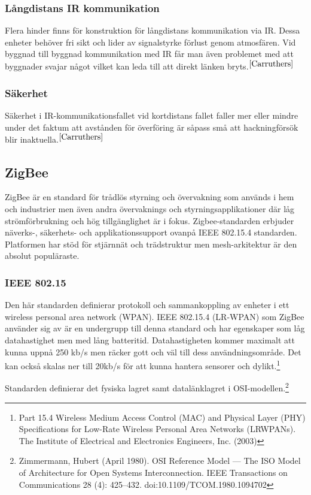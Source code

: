 \documentclass[a4paper,12pt,fleqn]{article}
\begin{document}
\subsubsection{Långdistans IR kommunikation}
Flera hinder finns för konstruktion för långdistans kommunikation via IR. Dessa enheter behöver fri sikt och lider av signalstyrke förlust genom atmosfären. Vid byggnad till byggnad kommunikation med IR får man även problemet med att byggnader svajar något vilket kan leda till att direkt länken bryts.$^{\ref{Carruthers}}$ 

\subsubsection{Säkerhet}
Säkerhet i IR-kommunikationsfallet vid kortdistans fallet faller mer eller mindre under det faktum att avstånden för överföring är såpass små att hackningförsök blir inaktuella.$^{\ref{Carruthers}}$

\subsection{ZigBee}
ZigBee är en standard för trådlös styrning och övervakning som används i hem och industrier men även andra övervaknings och styrningsapplikationer där låg strömförbrukning och hög tillgänglighet är i fokus. Zigbee-standarden erbjuder näverks-, säkerhets- och applikationssupport ovanpå IEEE 802.15.4 standarden. Platformen har stöd för stjärnnät och trädstruktur men mesh-arkitektur är den absolut populäraste. 

\subsubsection{IEEE 802.15}
Den här standarden definierar protokoll och sammankoppling av enheter i ett wireless personal area network (WPAN). IEEE 802.15.4 (LR-WPAN) som ZigBee använder sig av är en undergrupp till denna standard och har egenskaper som låg datahastighet men med lång batteritid. Datahastigheten kommer maximalt att kunna uppnå 250 kb/s men räcker gott och väl till dess användningsområde. Det kan också skalas ner till 20kb/s för att kunna hantera sensorer och dylikt.\footnote{Part 15.4 Wireless Medium Access Control (MAC) and Physical Layer (PHY) Specifications for Low-Rate Wireless Personal Area Networks (LR\text{-}WPANs). The Institute of Electrical and Electronics Engineers, Inc. (2003)}


Standarden definierar det fysiska lagret samt datalänklagret i OSI-modellen.\footnote{Zimmermann, Hubert (April 1980). OSI Reference Model — The ISO Model of Architecture for Open Systems Interconnection. IEEE Transactions on Communications 28 (4): 425–432. doi:10.1109/TCOM.1980.1094702} 
\end{document}
